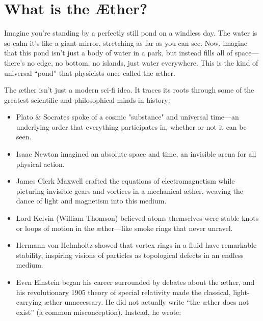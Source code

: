 
\section{What is the Æther?}

Imagine you’re standing by a perfectly still pond on a windless day. The water is so calm it’s like a giant mirror, stretching as far as you can see. Now, imagine that this pond isn’t just a body of water in a park, but instead fills all of space—there’s no edge, no bottom, no islands, just water everywhere. This is the kind of universal “pond” that physicists once called the æther.


The æther isn’t just a modern sci-fi idea. It traces its roots through some of the greatest scientific and philosophical minds in history:


\begin{itemize}

\item
Plato \& Socrates spoke of a cosmic "substance" and universal time—an underlying order that everything participates in, whether or not it can be seen.




\item
Isaac Newton imagined an absolute space and time, an invisible arena for all physical action.




\item
James Clerk Maxwell crafted the equations of electromagnetism while picturing invisible gears and vortices in a mechanical æther, weaving the dance of light and magnetism into this medium.




\item
Lord Kelvin (William Thomson) believed atoms themselves were stable knots or loops of motion in the æther—like smoke rings that never unravel.




\item
Hermann von Helmholtz showed that vortex rings in a fluid have remarkable stability, inspiring visions of particles as topological defects in an endless medium.




\item
Even Einstein began his career surrounded by debates about the æther, and his revolutionary 1905 theory of special relativity made the classical, light-carrying æther unnecessary. He did not actually write “the æther does not exist” (a common misconception). Instead, he wrote:




\end{itemize}
